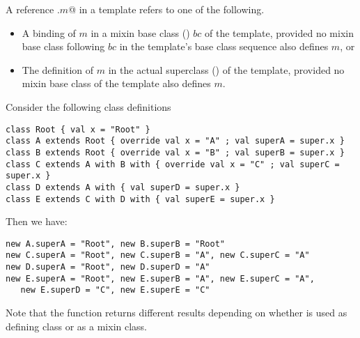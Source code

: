 \documentclass[11pt]{report}
\newcommand{\ifqualified}[1]{}
\begin{document}
\begin{itemize}
A reference \verb@super.$m$@ in a template refers to one of the
following.
\begin{itemize}
\item
A binding of $m$ in a mixin base class () $bc$
of the template, provided no mixin base class following $bc$ in the template's base class sequence also defines $m$, or
\item
The definition of $m$ in the actual superclass
() of the template, provided no
mixin base class of the template also
defines $m$.
\end{itemize}


\example\label{ex:super}
Consider the following class definitions

\begin{verbatim}
class Root { val x = "Root" }
class A extends Root { override val x = "A" ; val superA = super.x }
class B extends Root { override val x = "B" ; val superB = super.x }
class C extends A with B with { override val x = "C" ; val superC = super.x }
class D extends A with { val superD = super.x }
class E extends C with D with { val superE = super.x }
\end{verbatim}
Then we have:
\begin{verbatim}
new A.superA = "Root", new B.superB = "Root"
new C.superA = "Root", new C.superB = "A", new C.superC = "A"
new D.superA = "Root", new D.superD = "A"
new E.superA = "Root", new E.superB = "A", new E.superC = "A",
   new E.superD = "C", new E.superE = "C"
\end{verbatim}
Note that the \verb@superB@ function returns different results
depending on whether \verb@B@ is used as defining class or as a mixin class.

\ifqualified{
\example\label{ex:qualified-super}
Consider the class definitions
\begin{verbatim}
qualified class C with { def f: String = "C" }
qualified class D with { def f: String = "D" }
\end{verbatim}
Here is a subclass of \verb@C@ and \verb@D@ which overrides both
versions of \verb@f@ and invokes both previous definitions via \verb@super@:
\begin{verbatim}
class B extends C with D with {
  override C def f = (super:C).f ++ "B"
  override D def f = (super:D).f ++ "B"
}
\end{verbatim}
}


\end{itemize}
\end{document}
